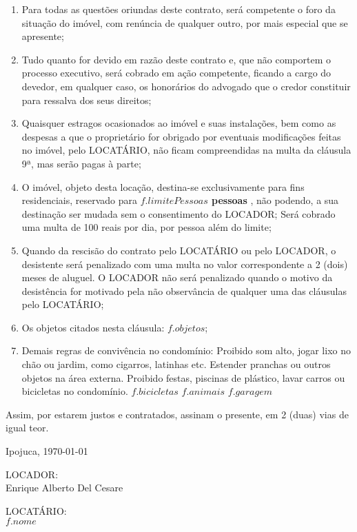 \documentclass[a4paper,12pt]{article}
\begin{document}
\begin{enumerate}
\item Para todas as questões oriundas deste contrato, será competente o foro da situação do imóvel, com renúncia de qualquer outro, por mais especial que se apresente;
\item Tudo quanto for devido em razão deste contrato e, que não comportem o processo executivo, será cobrado em ação competente, ficando a cargo do devedor, em qualquer caso, os honorários do advogado que o credor constituir para ressalva dos seus direitos;
\item Quaisquer estragos ocasionados ao imóvel e suas instalações, bem como as despesas a que o proprietário for obrigado por eventuais modificações feitas no imóvel, pelo LOCATÁRIO, não ficam compreendidas na multa da cláusula 9ª, mas serão pagas à parte;
\item O imóvel, objeto desta locação, destina-se exclusivamente para fins residenciais, 
reservado para \textbf{ ${f.limitePessoas}$ pessoas },  não podendo, a sua destinação ser mudada sem o consentimento do LOCADOR;
Será cobrado uma multa de 100 reais por dia, por pessoa além do limite;
\item Quando da rescisão do contrato pelo LOCATÁRIO  ou pelo LOCADOR, o desistente será penalizado com uma multa no valor correspondente a 2 (dois) meses de aluguel. O LOCADOR não será penalizado quando o motivo da desistência for motivado pela não observância de qualquer uma das cláusulas pelo LOCATÁRIO;
\item Os objetos citados nesta cláusula: ${f.objetos}$;
\item Demais regras de convivência no condomínio: Proibido som alto, jogar lixo no chão ou jardim, como cigarros, latinhas etc. 
Estender pranchas ou outros objetos na área externa.
Proibido festas, piscinas de plástico, lavar carros ou bicicletas no condomínio.
${f.bicicletas}$ ${f.animais}$ ${f.garagem}$

\end{enumerate}
Assim, por estarem justos e contratados, assinam o presente, em 2 (duas) vias de igual teor.

\begin{flushright}
Ipojuca, \today
\end{flushright}

\begin{center}

\vspace{2cm}

LOCADOR: \hrulefill
\\Enrique Alberto Del Cesare

\vspace{2.5cm}

LOCATÁRIO: \hrulefill
\\${f.nome}$
 \end{center}
\end{document}
